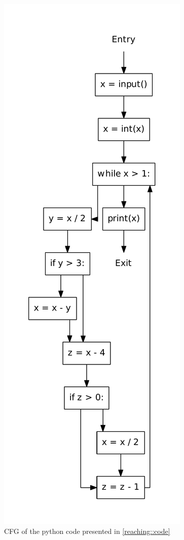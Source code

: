 \begin{figure}
  \begin{center}
  \includegraphics[scale=.5]{./figures/reaching_definitions.pdf}
  \caption{CFG of the python code presented in \cref{reaching::code}}
  \label{reaching::cfg}
  \end{center}
\end{figure}


